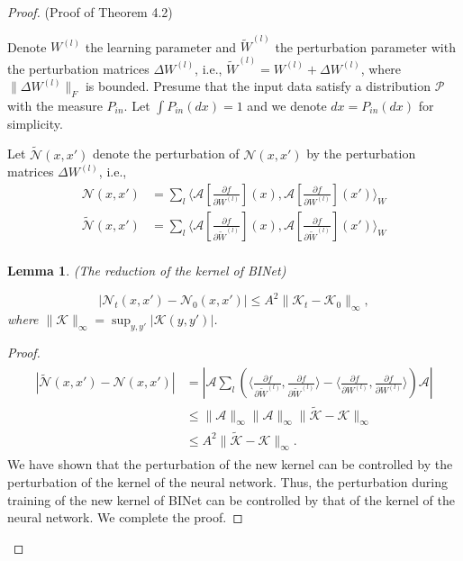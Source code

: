 \documentclass[hyperref]{article}
\numberwithin{equation}{section}
\theoremstyle{nonumberplain}
\newtheorem{proof}{Proof}
\newtheorem{lemma}{Lemma}[section]
\begin{document}
	
	\begin{proof}(Proof of Theorem 4.2)
		
		Denote $W^{(l)}$ the learning parameter and $\tilde{W}^{(l)}$ the perturbation parameter with the perturbation matrices $\Delta W^{(l)}$, i.e., $\tilde{W}^{(l)}=W^{(l)}+\Delta W^{(l)}$, where $\|\Delta W^{(l)}\|_F$ is bounded. Presume that the input data satisfy a distribution $\mathcal{P}$ with the measure $P_{in}$. Let $\int P_{in}(dx) = 1$ and we denote $dx=P_{in}(dx)$ for simplicity.
		
		
		Let $\tilde{\mathcal{N}}(x,x')$ denote the perturbation of $\mathcal{N}(x,x')$ by the perturbation matrices $\Delta W^{(l)}$, i.e., 
		\begin{align}
			\mathcal{N}(x,x') & = \sum_l\langle\mathcal{A}[\frac{\partial f}{\partial W^{(l)}}](x), \mathcal{A}[\frac{\partial f}{\partial W^{(l)}}](x')\rangle_W\\
			\tilde{\mathcal{N}}(x,x') & = \sum_l\langle\mathcal{A}[\frac{\partial f}{\partial \tilde{W}^{(l)}}](x), \mathcal{A}[\frac{\partial f}{\partial \tilde{W}^{(l)}}](x')\rangle_W\\
		\end{align}
		
		\begin{lemma}(The reduction of the kernel of BINet)
			
			\begin{equation}\label{eq.reduce}
				|\mathcal{N}_t(x,x')-\mathcal{N}_0(x,x')| \leq A^2\|\mathcal{K}_t-\mathcal{K}_0\|_\infty,
			\end{equation}
			where $\|\mathcal{K}\|_\infty = \sup_{y,y'} |\mathcal{K}(y,y')|$.
			\label{lemma.reduction}
		\end{lemma}
		
		
		\begin{proof}
			\begin{align}
				\begin{split}
					|\tilde{\mathcal{N}}(x,x')-\mathcal{N}(x,x')| & = |\mathcal{A}\sum_l (\langle\frac{\partial f}{\partial \tilde{W}^{(l)}}, \frac{\partial f}{\partial \tilde{W}^{(l)}}\rangle-\langle\frac{\partial f}{\partial W^{(l)}}, \frac{\partial f}{\partial W^{(l)}}\rangle)\mathcal{A}|\\
					& \leq \|\mathcal{A}\|_\infty\|\mathcal{A}\|_\infty\|\widetilde{\mathcal{K}}-\mathcal{K}\|_\infty\\
					&\leq A^2\|\widetilde{\mathcal{K}}-\mathcal{K}\|_\infty.
				\end{split}
			\end{align}
			We have shown that the perturbation of the new kernel can be controlled by the perturbation of the kernel of the neural network. Thus, the perturbation during training of the new kernel of BINet can be controlled by that of the kernel of the neural network. We complete the proof.
		\end{proof}
		

\end{proof}
\end{document}
